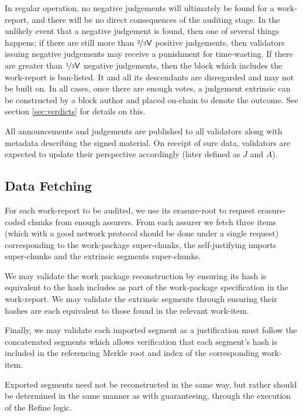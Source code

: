 In regular operation, no negative judgements will ultimately be found for a work-report, and there will be no direct consequences of the auditing stage. In the unlikely event that a negative judgement is found, then one of several things happens; if there are still more than $\nicefrac{2}{3}\mathsf{V}$ positive judgements, then validators issuing negative judgements may receive a punishment for time-wasting. If there are greater than $\nicefrac{1}{3}\mathsf{V}$ negative judgements, then the block which includes the work-report is ban-listed. It and all its descendants are disregarded and may not be built on. In all cases, once there are enough votes, a judgement extrinsic can be constructed by a block author and placed on-chain to denote the outcome. See section \ref{sec:verdicts} for details on this.

All announcements and judgements are published to all validators along with metadata describing the signed material. On receipt of sure data, validators are expected to update their perspective accordingly (later defined as $J$ and $A$).

\subsection{Data Fetching}

For each work-report to be audited, we use its erasure-root to request erasure-coded chunks from enough assurers. From each assurer we fetch three items (which with a good network protocol should be done under a single request) corresponding to the work-package super-chunks, the self-justifying imports super-chunks and the extrinsic segments super-chunks.

We may validate the work package reconstruction by ensuring its hash is equivalent to the hash includes as part of the work-package specification in the work-report. We may validate the extrinsic segments through ensuring their hashes are each equivalent to those found in the relevant work-item.

Finally, we may validate each imported segment as a justification must follow the concatenated segments which allows verification that each segment's hash is included in the referencing Merkle root and index of the corresponding work-item.

Exported segments need not be reconstructed in the same way, but rather should be determined in the same manner as with guaranteeing, \ie through the execution of the Refine logic.

